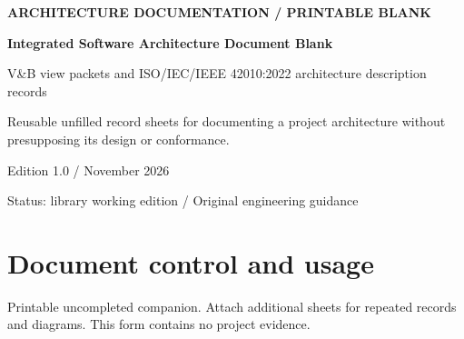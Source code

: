 \documentclass[11pt,letterpaper]{article}
\newcommand{\docsection}[1]{\Needspace{5\baselineskip}\section{#1}}
\begin{document}
\begin{titlepage}\thispagestyle{empty}\raggedright
\vspace*{0.65in}
{\sffamily\bfseries\color{teal} ARCHITECTURE DOCUMENTATION / PRINTABLE BLANK\par}
\vspace{0.35in}
{\sffamily\bfseries\color{navy}\Huge Integrated Software Architecture Document Blank\par}
\vspace{0.2in}
{\sffamily\Large\color{muted} V\&B view packets and ISO/IEC/IEEE 42010:2022 architecture description records\par}
\vspace{0.35in}\noindent{\color{teal}\rule{\linewidth}{1.5pt}}\par
\vspace{0.3in}
Reusable unfilled record sheets for documenting a project architecture without presupposing its design or conformance.

\vfill
{\sffamily\small Edition 1.0 \quad /  November 2026\par
Status: library working edition \quad / \quad Original engineering guidance\par}
\end{titlepage}
\tableofcontents\clearpage
\docsection{Document control and usage}
Printable uncompleted companion. Attach additional sheets for repeated records and diagrams. This form contains no project evidence.
\end{document}

